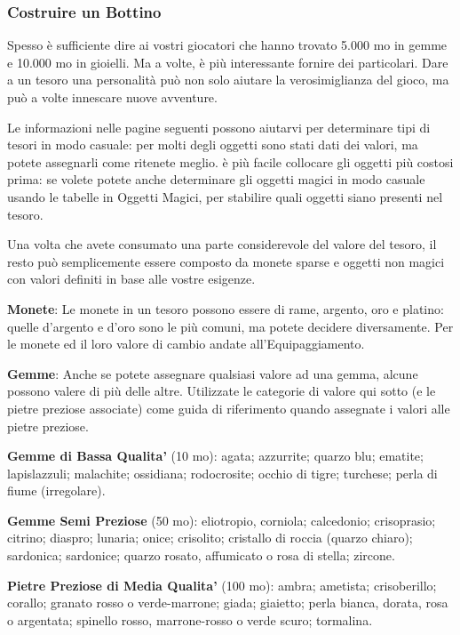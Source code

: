 \documentclass[a4paper,11pt,twoside,openany]{book}
\begin{document}
{\subsubsection{Costruire un Bottino}

Spesso è sufficiente dire ai vostri giocatori che hanno trovato 5.000
mo in gemme e 10.000 mo in gioielli. Ma a volte, è più interessante
fornire dei particolari. Dare a un tesoro una personalità può non
solo aiutare la verosimiglianza del gioco, ma può a volte innescare
nuove avventure.

Le informazioni nelle pagine seguenti possono aiutarvi per determinare tipi di tesori in modo casuale: per molti degli oggetti sono stati dati dei valori, ma potete assegnarli come ritenete meglio. è più facile collocare gli oggetti più costosi prima: se volete potete anche determinare gli oggetti magici in modo casuale usando le tabelle in Oggetti Magici, per stabilire quali oggetti siano presenti nel tesoro.

Una volta che avete consumato una parte considerevole del valore del tesoro, il resto può semplicemente essere composto da monete sparse e oggetti non magici con valori definiti in base alle vostre esigenze.

\textbf{Monete}: Le monete in un tesoro possono essere di rame, argento, oro e platino: quelle d'argento e d'oro sono le più comuni, ma potete decidere diversamente. Per le monete ed il loro valore di cambio andate all'Equipaggiamento.

\textbf{Gemme}: Anche se potete assegnare qualsiasi valore ad una gemma, alcune possono valere di più delle altre. Utilizzate le categorie di valore qui sotto (e le pietre preziose associate) come guida di riferimento quando assegnate i valori alle pietre preziose.

\textbf{Gemme di Bassa Qualita'} (10 mo): agata; azzurrite; quarzo blu; ematite; lapislazzuli; malachite; ossidiana; rodocrosite; occhio di tigre; turchese; perla di fiume (irregolare).

\textbf{Gemme Semi Preziose} (50 mo): eliotropio, corniola; calcedonio; crisoprasio; citrino; diaspro; lunaria; onice; crisolito; cristallo di roccia (quarzo chiaro); sardonica; sardonice; quarzo rosato, affumicato o rosa di stella; zircone.

\textbf{Pietre Preziose di Media Qualita'} (100 mo): ambra; ametista;
crisoberillo; corallo; granato rosso o verde-marrone; giada; giaietto;
perla bianca, dorata, rosa o argentata; spinello rosso, marrone-rosso
o verde scuro; tormalina.

}
\end{document}
